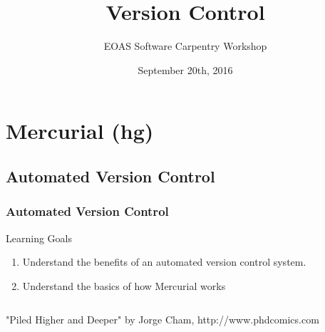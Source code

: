 \documentclass{beamer}
\title[Mercurial]{Version Control}
\subtitle[]{EOAS Software Carpentry Workshop }
\date[Sep 2016]{September 20th, 2016}
\begin{document}
\section*{Mercurial (hg)}

\begin{frame}[plain]
\titlepage
\end{frame}

\subsection*{Automated Version Control}
\begin{frame}
\frametitle{Automated Version Control}
\begin{block}{Learning Goals}
\begin{enumerate}
\item Understand the benefits of an automated version control system.
\item Understand the basics of how Mercurial works
\end{enumerate}
\end{block}
\end{frame}

\begin{frame}
\begin{columns}
"Piled Higher and Deeper" by Jorge Cham, http://www.phdcomics.com
\end{columns}
\end{frame}
\end{document}

